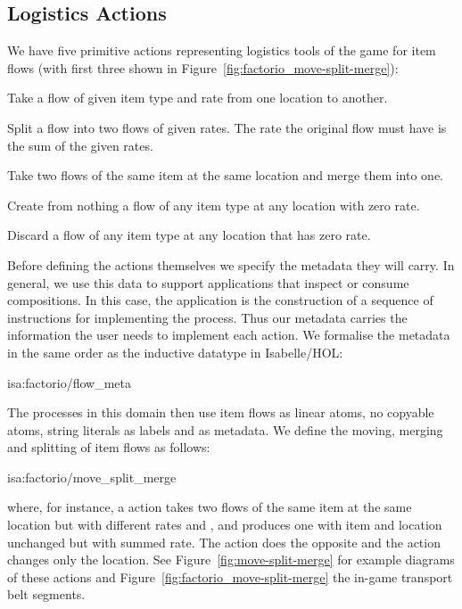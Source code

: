 \documentclass[class=smolathesis,crop=false]{standalone}
\begin{document}
\subsection{Logistics Actions}
\label{sec:cases/factorio/item-act}

We have five primitive actions representing logistics tools of the game for item flows (with first three shown in Figure~\ref{fig:factorio_move-split-merge}):
\begin{description}[style=nextline]
  \item[Moving a flow]
    Take a flow of given item type and rate from one location to another.
  \item[Splitting a flow]
    Split a flow into two flows of given rates.
    The rate the original flow must have is the sum of the given rates.
  \item[Merging flows]
    Take two flows of the same item at the same location and merge them into one.
  \item[Creating and empty flow]
    Create from nothing a flow of any item type at any location with zero rate.
  \item[Discarding an empty flow]
    Discard a flow of any item type at any location that has zero rate.
\end{description}

Before defining the actions themselves we specify the metadata they will carry.
In general, we use this data to support applications that inspect or consume compositions.
In this case, the application is the construction of a sequence of instructions for implementing the process.
Thus our metadata carries the information the user needs to implement each action.
We formalise the metadata in the same order as the inductive datatype  in Isabelle/HOL:
\begin{isadef}{isa:factorio/flow_meta}
  
\end{isadef}

The processes in this domain then use item flows as linear atoms, no copyable atoms, string literals as labels and  as metadata.
We define the moving, merging and splitting of item flows as follows:
\begin{isadef}{isa:factorio/move_split_merge}
  
\end{isadef}
\noindent
where, for instance, a  action takes two flows of the same item  at the same location  but with different rates  and , and produces one with item and location unchanged but with summed rate.
The  action does the opposite and the  action changes only the location.
See Figure~\ref{fig:move-split-merge} for example diagrams of these actions and Figure~\ref{fig:factorio_move-split-merge} the in-game transport belt segments.
\end{document}
